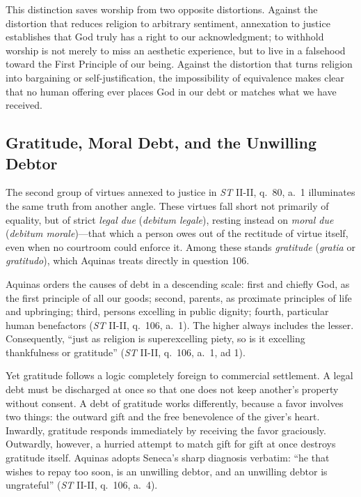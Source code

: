 This distinction saves worship from two opposite distortions. Against the distortion that reduces religion to arbitrary sentiment, annexation to justice establishes that God truly has a right to our acknowledgment; to withhold worship is not merely to miss an aesthetic experience, but to live in a falsehood toward the First Principle of our being. Against the distortion that turns religion into bargaining or self-justification, the impossibility of equivalence makes clear that no human offering ever places God in our debt or matches what we have received.

\subsection{Gratitude, Moral Debt, and the Unwilling Debtor}

The second group of virtues annexed to justice in \emph{ST} II-II, q.\ 80, a.\ 1 illuminates the same truth from another angle. These virtues fall short not primarily of equality, but of strict \emph{legal due} (\emph{debitum legale}), resting instead on \emph{moral due} (\emph{debitum morale})---that which a person owes out of the rectitude of virtue itself, even when no courtroom could enforce it. Among these stands \emph{gratitude} (\emph{gratia} or \emph{gratitudo}), which Aquinas treats directly in question 106.

Aquinas orders the causes of debt in a descending scale: first and chiefly God, as the first principle of all our goods; second, parents, as proximate principles of life and upbringing; third, persons excelling in public dignity; fourth, particular human benefactors (\emph{ST} II-II, q.\ 106, a.\ 1). The higher always includes the lesser. Consequently, ``just as religion is superexcelling piety, so is it excelling thankfulness or gratitude'' (\emph{ST} II-II, q.\ 106, a.\ 1, ad 1).

Yet gratitude follows a logic completely foreign to commercial settlement. A legal debt must be discharged at once so that one does not keep another's property without consent. A debt of gratitude works differently, because a favor involves two things: the outward gift and the free benevolence of the giver's heart. Inwardly, gratitude responds immediately by receiving the favor graciously. Outwardly, however, a hurried attempt to match gift for gift at once destroys gratitude itself. Aquinas adopts Seneca's sharp diagnosis verbatim: ``he that wishes to repay too soon, is an unwilling debtor, and an unwilling debtor is ungrateful'' (\emph{ST} II-II, q.\ 106, a.\ 4).

